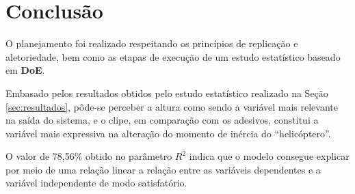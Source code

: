 \section{Conclusão}

O planejamento foi realizado respeitando os princípios de replicação e aletoriedade, bem como as etapas de execução de um estudo estatístico baseado em \textbf{DoE}.

Embasado pelos resultados obtidos pelo estudo estatístico realizado na Seção \ref{sec:resultados}, pôde-se perceber a altura como sendo a variável mais relevante na saída do sistema, e o clipe, em comparação com os adesivos, constitui a variável mais expressiva na alteração do momento de inércia do ``helicóptero''.

O valor de 78,56\% obtido no parâmetro $R^2$ indica que o modelo consegue explicar por meio de uma relação linear a relação entre as variáveis dependentes e a variável independente de modo satisfatório.